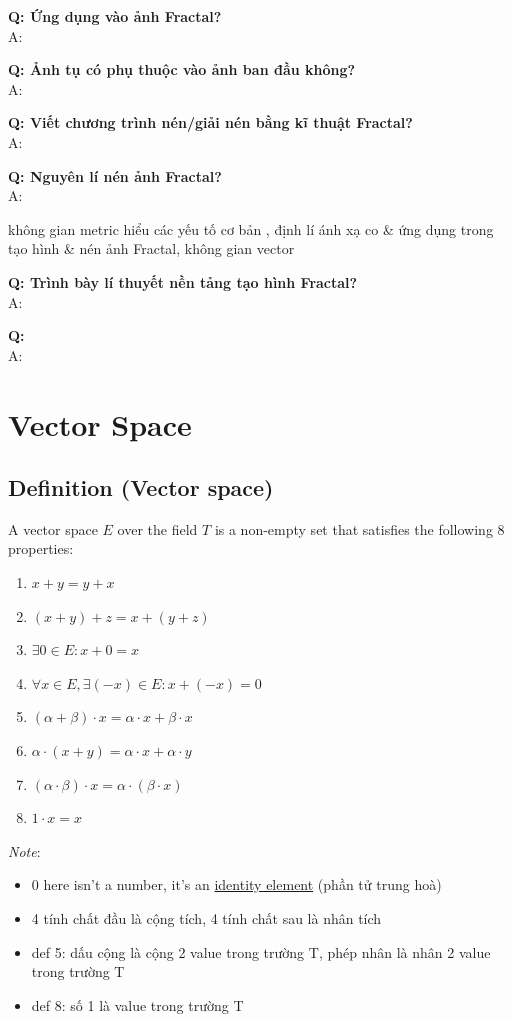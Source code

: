 \textbf{Q: Ứng dụng vào ảnh Fractal?}\\
A: 

\textbf{Q: Ảnh tụ có phụ thuộc vào ảnh ban đầu không?}\\
A:

\textbf{Q: Viết chương trình nén/giải nén bằng kĩ thuật Fractal?}\\
A: 

\textbf{Q: Nguyên lí nén ảnh Fractal?}\\
A: 


không gian metric hiểu các yếu tố cơ bản
, định lí ánh xạ co \& ứng dụng trong tạo hình \& nén ảnh Fractal, 
không gian vector

\textbf{Q: Trình bày lí thuyết nền tảng tạo hình Fractal?}\\
A: 


\textbf{Q: }\\
A: 

\newpage
\section{Vector Space}
\subsection{Definition (Vector space)}

A vector space $E$ over the field $T$ is a non-empty set that satisfies the following 8 properties:

\begin{enumerate}
    \item $x + y = y + x$
    \item $(x + y) + z = x + (y + z)$
    \item $\exists 0 \in E: x + 0 = x$
    \item $\forall x \in E, \exists (-x) \in E: x + (-x) = 0$
    \item $(\alpha + \beta) \cdot x = \alpha \cdot x + \beta \cdot x$
    \item $\alpha \cdot (x + y) = \alpha \cdot x + \alpha \cdot y$
    \item $(\alpha \cdot \beta) \cdot x = \alpha \cdot (\beta \cdot x)$
    \item $1 \cdot x = x$
\end{enumerate}
\textit{Note}: 
\begin{itemize}
    \item 0 here isn't a number, it's an \href{https://en.wikipedia.org/wiki/Identity_element}{identity element} (phần tử trung hoà)
    \item 4 tính chất đầu là cộng tích, 4 tính chất sau là nhân tích
    \item def 5: dấu cộng là cộng 2 value trong trường T, phép nhân là nhân 2 value trong trường T
    \item def 8: số 1 là value trong trường T
\end{itemize}

